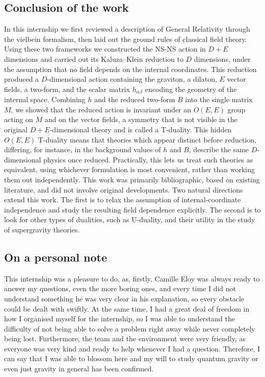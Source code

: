 \documentclass{article}
\begin{document}
\subsection{Conclusion of the work}
In this internship we first reviewed a description of General Relativity through the vielbein formalism, then laid out the ground rules of classical field theory. Using these two frameworks
we constructed the NS-NS action in $D+E$ dimensions and carried out its Kaluza--Klein reduction to $D$ dimensions, under the assumption that no field depends on the internal coordinates.
This reduction produced a $D$-dimensional action containing the graviton, a dilaton, $E$ vector fields, a two-form, and the scalar matrix $h_{\alpha\beta}$ encoding the geometry of the internal space. Combining $h$ and the reduced two-form $B$ into the single matrix $M$, we showed that the reduced action is invariant under an $O(E,E)$ group acting on $M$ and on the vector fields, a symmetry that is not visible in the original $D+E$-dimensional theory and is called a T-duality.
This hidden $O(E,E)$ T-duality means that theories which appear distinct before reduction, differing, for instance, in the background values of $h$ and $B$, describe the same $D$-dimensional physics once reduced. Practically, this lets us treat such theories as equivalent, using whichever formulation is most convenient, rather than working them out independently.
This work was primarily bibliographic, based on existing literature, and did not involve original developments.
Two natural directions extend this work. The first is to relax the assumption of internal-coordinate independence and study the resulting field dependence explicitly. The second is to look for other types of dualities, such as U-duality, and their utility in the study of supergravity theories.
\subsection{On a personal note}
This internship was a pleasure to do, as, firstly, Camille Eloy was always ready to answer my questions,
even the more boring ones, and every time I did not understand something he was very clear in his explanation,
so every obstacle could be dealt with swiftly. At the same time, I had a great deal of freedom in how I organised myself for the internship,
so I was able to understand the difficulty of not being able to solve a problem right away while never completely being lost.
Furthermore, the team and the environment were very friendly, as everyone was very kind and ready to help whenever I had a question.
Therefore, I can say that I was able to blossom here and my will to study quantum gravity or even just gravity in general has been confirmed.
 \printbibliography
 \appendix
\end{document}

